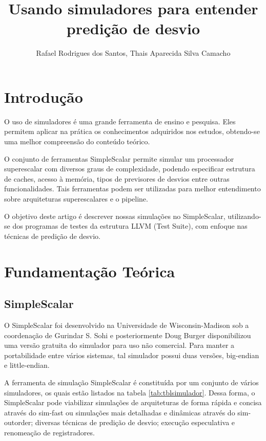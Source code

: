 \documentclass[12pt]{article}
\title{Usando simuladores para entender predição de desvio}
\author{Rafael Rodrigues dos Santos\inst{1}, Thais Aparecida Silva Camacho\inst{1}}
\begin{document}
 

\maketitle

\section{Introdução}

O uso de simuladores é uma grande ferramenta de ensino e pesquisa. Eles permitem aplicar na prática os conhecimentos adquiridos nos estudos, obtendo-se uma
melhor compreensão do conteúdo teórico.

O conjunto de ferramentas SimpleScalar \cite{austin1997user} permite simular um processador superescalar com diversos graus de complexidade, podendo especificar
estrutura de caches, acesso à memória, tipos de previsores de desvios entre outras funcionalidades. Tais ferramentas podem ser utilizadas para melhor
entendimento sobre arquiteturas superescalares e o pipeline.

O objetivo deste artigo é descrever nossas simulações no SimpleScalar, utilizando-se dos programas de testes da estrutura LLVM (Test Suite), com enfoque nas técnicas de predição de desvio.

\section{Fundamentação Teórica} \label{sec:firstpage} 

\subsection{SimpleScalar}

O SimpleScalar foi desenvolvido na Universidade de Wisconsin-Madison sob a coordenação de Gurindar S. Sohi e posteriormente Doug Burger disponibilizou uma versão gratuita do simulador para uso não comercial. Para manter a portabilidade entre vários sistemas, tal simulador possui duas versões, big-endian e little-endian. 

A ferramenta de simulação SimpleScalar é constituída por um conjunto de vários simuladores, os quais estão listados na tabela \ref{tab:tblsimulador}. Dessa
forma, o SimpleScalar pode viabilizar simulações de arquiteturas de forma rápida e concisa através do sim-fast ou simulações mais detalhadas e dinâmicas através
do sim-outorder; diversas técnicas de predição de desvio; execução especulativa e renomeação de registradores.
\end{document}
